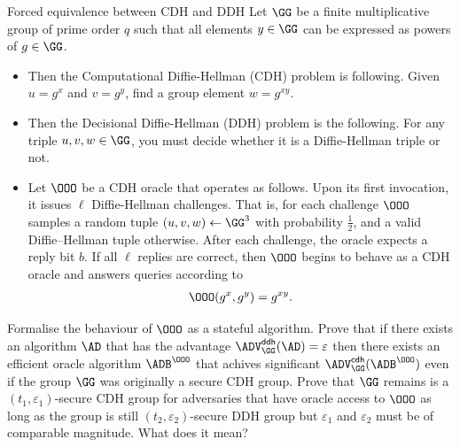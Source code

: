 \documentclass{crypto-exercise}
\author{Sven Laur}
\begin{document}
\begin{exercise}{Forced equivalence between CDH and DDH}
  Let $\GG$ be a finite multiplicative group of prime order $q$ such that all elements $y\in\GG$ can be
  expressed as powers of $g\in\GG$.
  \begin{itemize}
  \item  Then the Computational
  Diffie-Hellman (CDH) problem is following. Given $u=g^x$ and
  $v=g^y$, find a group element $w=g^{xy}$. 
  \item Then the Decisional
  Diffie-Hellman (DDH) problem is the following. For any triple
  $u,v,w\in\GG$, you must decide whether it is a Diffie-Hellman triple
  or not.
  \item Let $\OOO$ be a CDH oracle that operates as follows. Upon its first invocation, it issues $\ell$ Diffie-Hellman challenges. That is, for each challenge $\OOO$ samples a random tuple $(u,v,w)\gets \GG^3$ with probability $\tfrac{1}{2}$, and a valid Diffie--Hellman tuple otherwise. After each challenge, the oracle expects a reply bit $b$.
If all $\ell$ replies are correct, then $\OOO$ begins to behave as a CDH oracle and answers queries according to
\begin{align*}
\OOO(g^x, g^y) = g^{xy}.
\end{align*}
\end{itemize}
Formalise the behaviour of $\OOO$ as a stateful algorithm.
 Prove that if there exists an algorithm $\AD$ that has the advantage $\ADVDDH{\GG}{\AD}=\varepsilon$ then there exists an efficient oracle algorithm $\ADB^\OOO$ that achives significant $\ADVCDH{\GG}{\ADB^\OOO}$  even if the group $\GG$ was originally  a secure CDH group. Prove that $\GG$ remains is a $(t_1,\varepsilon_1)$-secure CDH group for adversaries that have oracle access to $\OOO$ as long as the group is still $(t_2,\varepsilon_2)$-secure DDH group but $\varepsilon_1$ and $\varepsilon_2$ must be of comparable magnitude.  What does it mean? 
\end{exercise}
\begin{solution}

\end{solution}
\end{document}
